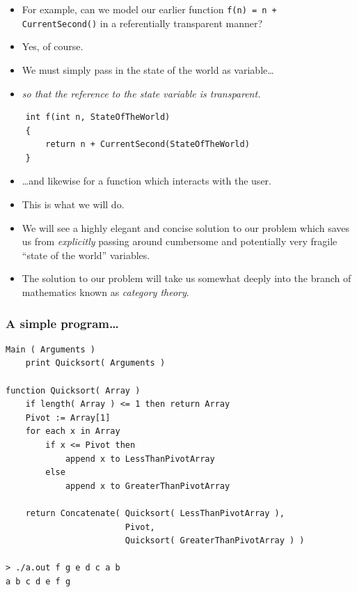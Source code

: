 \documentclass[xcolor=pdftex,dvipsnames,table]{beamer}
\newcommand{\hili}[1]{\emph{\textcolor{title}{#1}}}
\begin{document}
\begin{frame}[fragile]
    \begin{itemize}
        \item For example, can we model our earlier function
            \verb|f(n) = n + CurrentSecond()| in a referentially
            transparent manner? \pause
        \item Yes, of course. \pause
        \item We must simply pass in the state of the world as
            variable\ldots{} \pause
        \item \textit{so that the \hili{reference} to the state variable is
            \hili{transparent}.} \pause
    \end{itemize}
{\small
\begin{verbatim}
    int f(int n, StateOfTheWorld)
    {
        return n + CurrentSecond(StateOfTheWorld)
    }
\end{verbatim}
} \pause
\begin{itemize}
    \item \ldots and likewise for a function which interacts with the
        user.
\end{itemize}
\end{frame}

\begin{frame}
    \begin{itemize}
        \item This is what we will do.\pause
        \item We will see a highly elegant and concise solution to our
            problem which saves us from \hili{explicitly} passing
            around cumbersome and potentially very fragile ``state of
            the world'' variables. \pause
        \item The solution to our problem will take us somewhat deeply
            into the branch of mathematics known as \hili{category theory}.
    \end{itemize}
\end{frame}

\begin{frame}[fragile]
    \frametitle{A simple program\ldots}
{\scriptsize
\begin{verbatim}
Main ( Arguments )
    print Quicksort( Arguments )

function Quicksort( Array )
    if length( Array ) <= 1 then return Array
    Pivot := Array[1]
    for each x in Array
        if x <= Pivot then
            append x to LessThanPivotArray
        else
            append x to GreaterThanPivotArray

    return Concatenate( Quicksort( LessThanPivotArray ),
                        Pivot,
                        Quicksort( GreaterThanPivotArray ) )

> ./a.out f g e d c a b
a b c d e f g
\end{verbatim} }
\end{frame}
\end{document}
